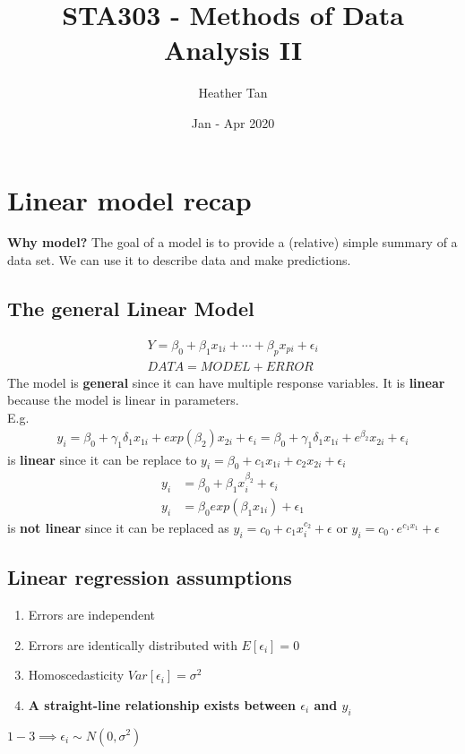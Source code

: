 \documentclass{article}
\title{STA303 - Methods of Data Analysis II}
\author{Heather Tan}
\date{Jan - Apr 2020}
\theoremstyle{definition}
\theoremstyle{thrm}
\theoremstyle{lma}
\theoremstyle{ppst}
\theoremstyle{crlr}
\begin{document}
\maketitle	
\tableofcontents
\pagebreak

\section{Linear model recap}
\textbf{Why model?}
The goal of a model is to provide a (relative) simple summary of a data set. We can use it to describe data and make predictions.
\subsection{The general Linear Model}
\begin{align*}
	Y = \beta_0+\beta_1x_{1i}+\cdots+\beta_p x_{pi}+\epsilon_i\\
	DATA = MODEL+ ERROR
\end{align*}
The model is \textbf{general }since it can have multiple response variables. It is \textbf{linear }because the model is linear in parameters.\\
E.g.
\begin{align*}
	y_i = \beta_0+\gamma_1\delta_1x_{1i}+exp(\beta_2)x_{2i}+\epsilon_i =  \beta_0+\gamma_1\delta_1x_{1i}+e^{\beta_2}x_{2i}+\epsilon_i
\end{align*} is \textbf{linear} since it can be replace to  $y_i = \beta_0+c_1 x_{1i}+c_2x_{2i}+\epsilon_i$
\begin{align*}
	y_i &= \beta_0+\beta_1x_i^{\beta_2}+\epsilon_i\\
	y_i &= \beta_0exp(\beta_1x_{1i})+\epsilon_1
\end{align*}
is \textbf{not linear} since it can be replaced as $y_i = c_0+c_1x_i^{c_2}+\epsilon$ or $y_i = c_0\cdot e^{c_1x_1}+\epsilon$

\subsection{Linear regression assumptions}
\begin{enumerate}
	\item Errors are independent
	\item Errors are identically distributed with $E[\epsilon_i]=0$
	\item Homoscedasticity $Var[\epsilon_i] = \sigma^2$
	\item \textbf{A straight-line relationship exists between $\epsilon_i$ and $y_i$}
\end{enumerate}
$1-3 \implies \epsilon_i \sim N(0,\sigma^2)$
\end{document}
